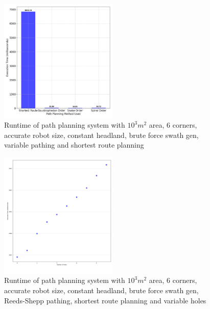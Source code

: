 \documentclass[final]{cmpreport_02}
\begin{document}
\begin{figure}[h!]
	\centering
	\includegraphics[width=0.5\textwidth]{./images/pathingRoutePlanningRT.png}
	\caption{Runtime of path planning system with $10^3m^2$ area, 6 corners, accurate robot size, constant headland, brute force swath gen, variable pathing and shortest route planning}
	\label{PE:p:RoutePlanningRT}
\end{figure}


\begin{figure}[h!]
	\centering
	\includegraphics[width=0.5\textwidth]{./images/pathingHolesRT.png}
	\caption{Runtime of path planning system with $10^3m^2$ area, 6 corners, accurate robot size, constant headland, brute force swath gen, Reeds-Shepp pathing, shortest route planning and variable holes}
	\label{PE:p:HolesRT}
\end{figure}
\end{document}
